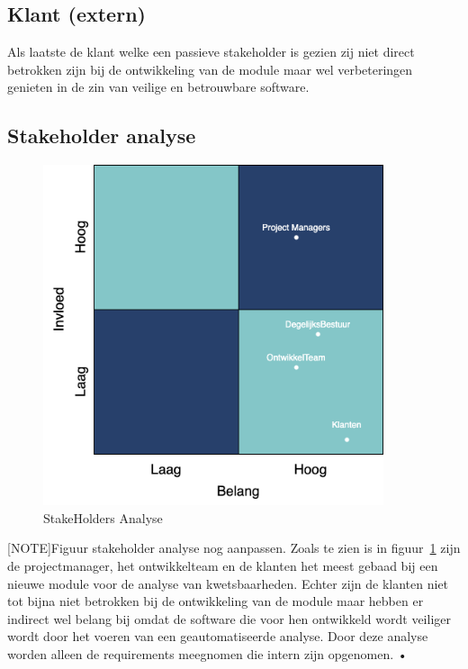 \subsection{Klant (extern)}\label{subsec:klant-(extern)1}
Als laatste de klant welke een passieve stakeholder is gezien zij niet direct betrokken zijn bij de ontwikkeling van de module maar wel verbeteringen genieten in de zin van veilige en betrouwbare software.

\subsection{Stakeholder analyse}\label{subsec:stakeholder-analyse1}
\begin{figure}[H]
    \myfloatalign
    \includegraphics[width=10cm]{gfx/stakeholderanalyse}
    \caption{StakeHolders Analyse}
    \label{fig:StakeholderAnalyse1}
\end{figure}
[NOTE]Figuur stakeholder analyse nog aanpassen.
Zoals te zien is in figuur~\ref{fig:StakeholderAnalyse1} zijn de projectmanager, het ontwikkelteam en de klanten het meest gebaad bij een nieuwe module voor de analyse van kwetsbaarheden.
Echter zijn de klanten niet tot bijna niet betrokken bij de ontwikkeling van de module maar hebben er indirect wel belang bij omdat de software die voor hen ontwikkeld wordt veiliger wordt door het voeren van een geautomatiseerde analyse.
Door deze analyse worden alleen de requirements meegnomen die intern zijn opgenomen.
•


